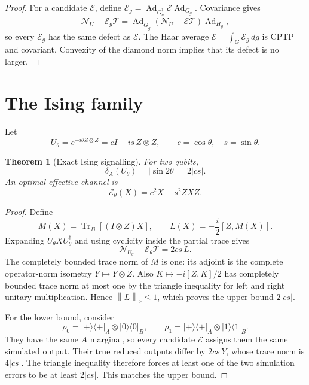 \documentclass[11pt,a4paper]{article}
\newtheorem{theorem}{Theorem}
\theoremstyle{remark}
\newcommand{\Tr}{\operatorname{Tr}}
\newcommand{\Ad}{\operatorname{Ad}}
\newcommand{\cE}{\mathcal{E}}
\newcommand{\cN}{\mathcal{N}}
\newcommand{\cT}{\mathcal{T}}
\newcommand{\diamondnorm}[1]{\left\lVert #1\right\rVert_{\diamond}}
\begin{document}
\begin{proof}
For a candidate $\cE$, define
$\cE_g=\Ad_{G_g^\dagger}\cE\Ad_{G_g}$.  Covariance gives
\[
 \cN_U-\cE_g\cT
 =\Ad_{G_g^\dagger}(\cN_U-\cE\cT)\Ad_{H_g},
\]
so every $\cE_g$ has the same defect as $\cE$.  The Haar average
$\overline{\cE}=\int_G\cE_g\,dg$ is CPTP and covariant.  Convexity of the
diamond norm implies that its defect is no larger.
\end{proof}

\section{The Ising family}

Let
\[
 U_\theta=e^{-i\theta Z\otimes Z}
          =cI-is\,Z\otimes Z,\qquad c=\cos\theta,\quad s=\sin\theta.
\]

\begin{theorem}[Exact Ising signalling]
\label{thm:ising}
For two qubits,
\begin{equation}
 \delta_A(U_\theta)=|\sin 2\theta|=2|cs|.
 \label{eq:ising-result}
\end{equation}
An optimal effective channel is
\[
 \cE_\theta(X)=c^2X+s^2ZXZ.
\]
\end{theorem}

\begin{proof}
Define
\[
 M(X)=\Tr_B[(I\otimes Z)X],\qquad
 L(X)=-\frac{i}{2}[Z,M(X)].
\]
Expanding $U_\theta XU_\theta^\dagger$ and using cyclicity inside the partial
trace gives
\begin{equation}
 \cN_{U_\theta}-\cE_\theta\cT
 =2cs\,L.
 \label{eq:ising-factor}
\end{equation}
The completely bounded trace norm of $M$ is one: its adjoint is the complete
operator-norm isometry $Y\mapsto Y\otimes Z$.  Also
$K\mapsto-i[Z,K]/2$ has completely bounded trace norm at most one by the
triangle inequality for left and right unitary multiplication.  Hence
$\diamondnorm{L}\leq1$, which proves the upper bound $2|cs|$.

For the lower bound, consider
\[
 \rho_0=|+\rangle\langle+|_A\otimes|0\rangle\langle0|_B,\qquad
 \rho_1=|+\rangle\langle+|_A\otimes|1\rangle\langle1|_B.
\]
They have the same $A$ marginal, so every candidate $\cE$ assigns them the
same simulated output.  Their true reduced outputs differ by $2cs\,Y$, whose
trace norm is $4|cs|$.  The triangle inequality therefore forces at least one
of the two simulation errors to be at least $2|cs|$.  This matches the upper
bound.
\end{proof}
\end{document}
